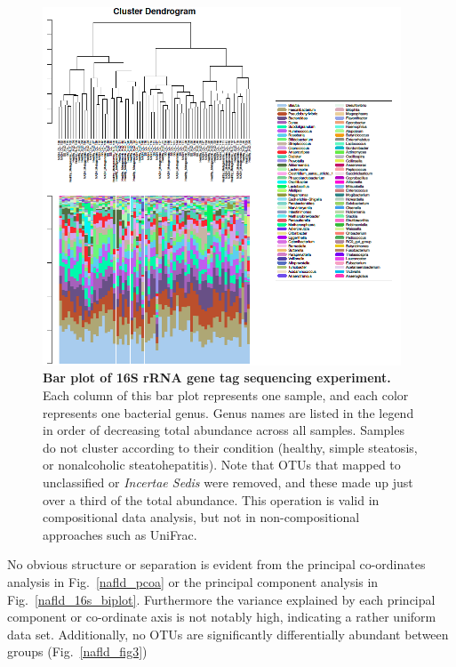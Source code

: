 \begin{figure}[h]
\begin{center}
\includegraphics[width=0.95\textwidth]{16s_genus_barplot.png}
\caption[Bar plot of 16S rRNA gene tag sequencing experiment.]{\textbf{Bar plot of 16S rRNA gene tag sequencing experiment.} Each column of this bar plot represents one sample, and each color represents one bacterial genus. Genus names are listed in the legend in order of decreasing total abundance across all samples. Samples do not cluster according to their condition (healthy, simple steatosis, or nonalcoholic steatohepatitis). Note that OTUs that mapped to unclassified or \textit{Incertae Sedis} were removed, and these made up just over a third of the total abundance. This operation is valid in compositional data analysis, but not in non-compositional approaches such as UniFrac.}
\label{nafld_16s_barplot}
\end{center}
\end{figure}

No obvious structure or separation is evident from the principal co-ordinates analysis in Fig.~\ref{nafld_pcoa} or the principal component analysis in Fig.~\ref{nafld_16s_biplot}. Furthermore the variance explained by each principal component or co-ordinate axis is not notably high, indicating a rather uniform data set. Additionally, no OTUs are significantly differentially abundant between groups (Fig.~\ref{nafld_fig3})


